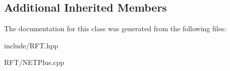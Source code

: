 \subsection*{Additional Inherited Members}


The documentation for this class was generated from the following files\+:\begin{DoxyCompactItemize}
\item 
include/R\+F\+T.\+hpp\item 
R\+F\+T/N\+E\+T\+Plus.\+cpp\end{DoxyCompactItemize}

